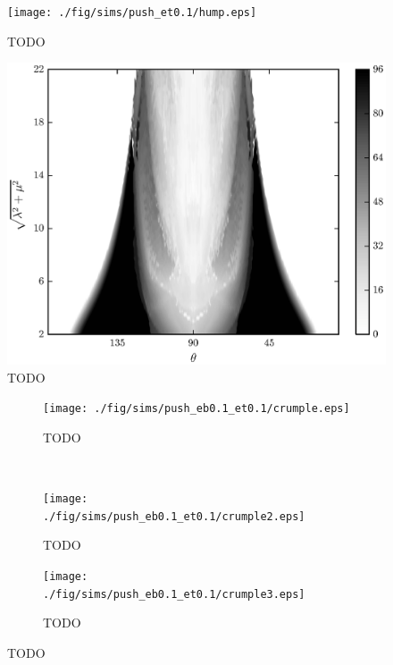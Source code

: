 	\begin{figure}
		\begin{center}
			\texttt{[image: ./fig/sims/push\_et0.1/hump.eps]}
		\end{center}		
		\caption{ TODO
		\label{fig:push_hump}}
	\end{figure}	

	\begin{figure}[t]
		\begin{center}
			\includegraphics{./fig/ch3/push/eb0.1_et0.1/grid.eps}
		\end{center}		
		\caption{ TODO
		\label{fig:PushGrid:eb0.1_et0.1}}
	\end{figure}	

	\begin{figure}
		\centering
		\begin{subfigure}{.5\textwidth}
			\centering
			\texttt{[image: ./fig/sims/push\_eb0.1\_et0.1/crumple.eps]}
			\caption{TODO \label{subfig:push_crumple}}
		\end{subfigure}%
		~
		\begin{subfigure}{.5\textwidth}
			\centering
			\texttt{[image: ./fig/sims/push\_eb0.1\_et0.1/crumple2.eps]}
			\caption{TODO \label{subfig:push_crumple2}}
		\end{subfigure}

		\begin{subfigure}{.5\textwidth}
			\centering
			\texttt{[image: ./fig/sims/push\_eb0.1\_et0.1/crumple3.eps]}
			\caption{TODO \label{subfig:push_crumple3}}
		\end{subfigure}		
		\caption{TODO\label{fig:push_crumple}}	
	\end{figure}


